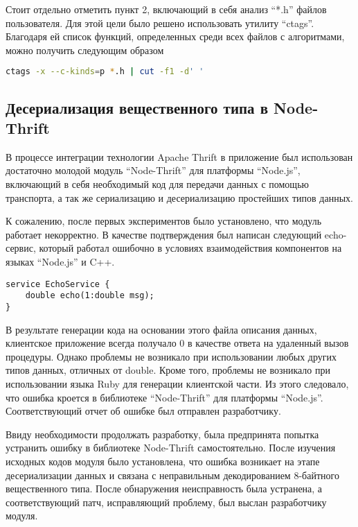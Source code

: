 Стоит отдельно отметить пункт 2, включающий в себя анализ ``*.h'' файлов
пользователя. Для этой цели было решено использовать утилиту ``ctags''.
Благодаря ей список функций, определенных среди всех файлов с алгоритмами, можно
получить следующим образом
\begin{lstlisting}[language=bash]
    ctags -x --c-kinds=p *.h | cut -f1 -d' '
\end{lstlisting}

\subsection{Десериализация вещественного типа в Node-Thrift}

В процессе интеграции технологии Apache Thrift в приложение был использован
достаточно молодой модуль ``Node-Thrift'' для платформы ``Node.js'', включающий
в себя
необходимый код для передачи данных с помощью транспорта, а так же сериализацию
и десериализацию простейших типов данных.

К сожалению, после первых экспериментов было установлено, что модуль работает
некорректно. В качестве подтверждения был написан следующий echo-сервис, который
работал ошибочно в условиях взаимодействия компонентов на языках ``Node.js'' и
C++.

\begin{lstlisting}
service EchoService {
    double echo(1:double msg);
}
\end{lstlisting}

В результате генерации кода на основании этого файла описания данных,
клиентское приложение всегда получало 0 в качестве ответа на удаленный
вызов процедуры. Однако проблемы не возникало при использовании любых других
типов данных, отличных от double. Кроме того, проблемы не возникало при
использовании языка Ruby для генерации клиентской части. Из этого следовало, что
ошибка кроется в библиотеке ``Node-Thrift'' для платформы ``Node.js''.
Соответствующий отчет об ошибке был отправлен разработчику.

Ввиду необходимости продолжать разработку, была предпринята попытка устранить
ошибку в библиотеке Node-Thrift самостоятельно. После изучения исходных
кодов модуля было установлена, что ошибка возникает на этапе десериализации
данных и связана с неправильным декодированием 8-байтного вещественного типа.
После обнаружения неисправность была устранена, а соответствующий
патч\cite{nodethriftpatch},
исправляющий проблему, был выслан разработчику модуля.

